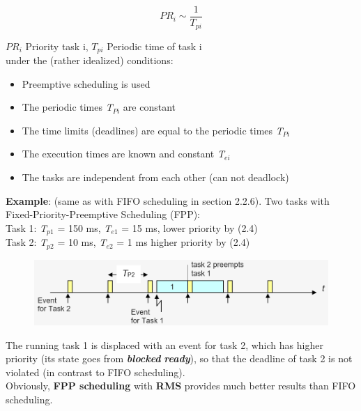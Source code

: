 \begin{equation}
	PR_{i} \sim \frac{1}{T_{pi} } 
\label{EQ }
\end{equation}

$PR_i$ Priority task i, $T_{pi}$ Periodic time of task i\\

under the (rather idealized) conditions:

\begin{itemize}
	\item  Preemptive scheduling is used
	\item  The periodic times \textit{T${}_{Pi}$} are constant 		
	\item  The time limits (deadlines) are equal to the periodic times \textit{T${}_{Pi}$}
	\item  The execution times are known and constant \textit{T${}_{ei}$}
	\item  The tasks are independent from each other (can not deadlock)
\end{itemize}

\textbf{Example}: (same as with FIFO scheduling in section 2.2.6). Two tasks with Fixed-Priority-Preemptive Scheduling (FPP):\\

Task 1: \textit{T}${}_{p1}$ = 150 ms, \textit{T}${}_{e1}$ = 15 ms,   lower priority by   (2.4)\\
Task 2: \textit{T}${}_{p2}$ = 10 ms,  \textit{T}${}_{e2}$ = 1 ms   higher priority by (2.4)\\

 	\begin{figure}[h]
    \centering
    \includegraphics[width=12cm, height=2.5cm]{Images/image99.png}
    \label{fig:Fig }
    \end{figure}

The running task 1 is displaced with an event for task 2, which has higher priority (its state goes from \textbf{\textit{blocked}}  \textbf{\textit{ready}}), so that the deadline of task 2 is not violated (in contrast to FIFO scheduling).\\

Obviously,\textbf{ FPP scheduling} with \textbf{RMS} provides much better results than FIFO scheduling. \\


